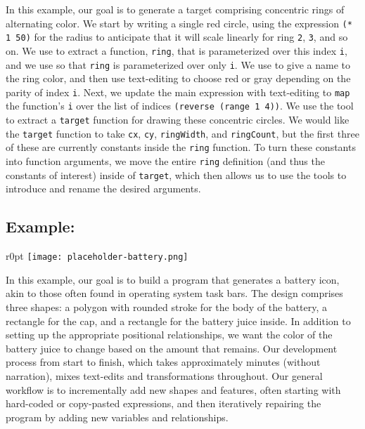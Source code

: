 In this example, our goal is to generate a target comprising
concentric rings of alternating color. We start by writing a single
red circle, using the expression \verb+(* 1 50)+ for the radius to
anticipate that it will scale linearly for ring \verb+2+, \verb+3+, and
so on. We use  to extract a function,
\verb+ring+, that is parameterized over this index \verb+i+, and we use
 so that \verb+ring+ is parameterized over
only \verb+i+. We use  to give a name to the ring color,
and then use text-editing to choose red or gray depending on the
parity of index \verb+i+.
%
Next, we update the main expression with text-editing to \verb+map+
the function's \verb+i+ over the list of indices \verb+(reverse (range 1 4))+.
We use the  tool to extract a \verb+target+ function
for drawing these concentric circles. We would like the
\verb+target+ function to take \verb+cx+, \verb+cy+, \verb+ringWidth+, and
\verb+ringCount+, but the first three of these are currently constants
inside the \verb+ring+ function. To turn these constants into function
arguments, we move the entire \verb+ring+ definition (and thus the constants of interest)
inside of \verb+target+, which then allows us to use the \deuce{} tools to
introduce and rename the desired arguments.


\subsection{Example: \exampleTwo{}}

\begin{wrapfigure}{r}{0pt}
\texttt{[image: placeholder-battery.png]}
\end{wrapfigure}

In this example, our goal is to build a program that generates a
battery icon, akin to those often found in operating system task bars.
The design comprises three shapes: a polygon with rounded stroke
for the body of the battery, a rectangle for the cap, and a
rectangle for the battery juice inside. In addition to setting up the
appropriate positional relationships, we want the color of the battery
juice to change based on the amount that remains.
Our development process from start to finish, which takes
approximately \timeRawVideoBattery{} minutes (without narration),
mixes text-edits and \deuce{} transformations throughout. Our
general workflow is to incrementally add new shapes and features,
often starting with hard-coded or copy-pasted expressions, and then
iteratively repairing the program by adding new variables and
relationships.

